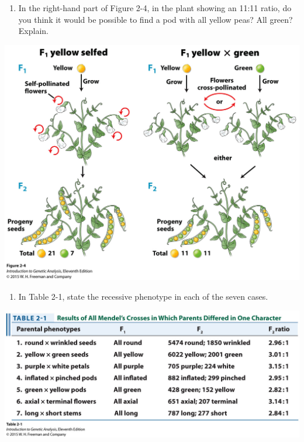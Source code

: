 \documentclass[11pt,]{article}
\providecommand{\tightlist}{%
  \setlength{\itemsep}{0pt}\setlength{\parskip}{0pt}}
\begin{document}
\begin{blackbox}

\begin{enumerate}
\def\labelenumi{\arabic{enumi}.}
\setcounter{enumi}{1}
\tightlist
\item
  In the right-hand part of Figure 2-4, in the plant showing an 11:11
  ratio, do you think it would be possible to find a pod with all yellow
  peas? All green? Explain.
\end{enumerate}

\hfill\break

\begin{center}\includegraphics[width=0.65\linewidth,]{input/figure_02_04} \end{center}

\vspace{12cm}

\end{blackbox}

\begin{blackbox}

\begin{enumerate}
\def\labelenumi{\arabic{enumi}.}
\setcounter{enumi}{2}
\tightlist
\item
  In Table 2-1, state the recessive phenotype in each of the seven
  cases.
\end{enumerate}

\hfill\break

\begin{center}\includegraphics[width=0.65\linewidth,]{input/table_02_01} \end{center}

\vspace{14cm}

\end{blackbox}
\end{document}
